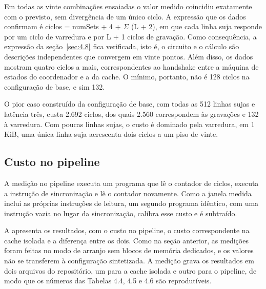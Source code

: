 Em todas as vinte combinações ensaiadas o valor medido coincidiu exatamente com o previsto, sem divergência de um único ciclo. A expressão que os dados confirmam é ciclos = numSets + 4 + $\Sigma$ (L + 2), em que cada linha suja responde por um ciclo de varredura e por L + 1 ciclos de gravação. Como consequência, a expressão da seção~\ref{sec:4.8} fica verificada, isto é, o circuito e o cálculo são descrições independentes que convergem em vinte pontos. Além disso, os dados mostram quatro ciclos a mais, correspondentes ao handshake entre a máquina de estados do coordenador e a da cache. O mínimo, portanto, não é 128 ciclos na configuração de base, e sim 132.

O pior caso construído da configuração de base, com todas as 512 linhas sujas e latência três, custa 2.692 ciclos, dos quais 2.560 correspondem às gravações e 132 à varredura. Com poucas linhas sujas, o custo é dominado pela varredura, em 1 KiB, uma única linha suja acrescenta dois ciclos a um piso de vinte.

\subsection{Custo no pipeline}\label{sec:4.3.2}

A medição no pipeline executa um programa que lê o contador de ciclos, executa a instrução de sincronização e lê o contador novamente. Como a janela medida inclui as próprias instruções de leitura, um segundo programa idêntico, com uma instrução vazia no lugar da sincronização, calibra esse custo e é subtraído.

A  apresenta os resultados, com o custo no pipeline, o custo correspondente na cache isolada e a diferença entre os dois. Como na seção anterior, as medições foram feitas no modo de arranjo sem blocos de memória dedicados, e os valores não se transferem à configuração sintetizada. A medição grava os resultados em dois arquivos do repositório, um para a cache isolada e outro para o pipeline, de modo que os números das Tabelas 4.4, 4.5 e 4.6 são reprodutíveis.

